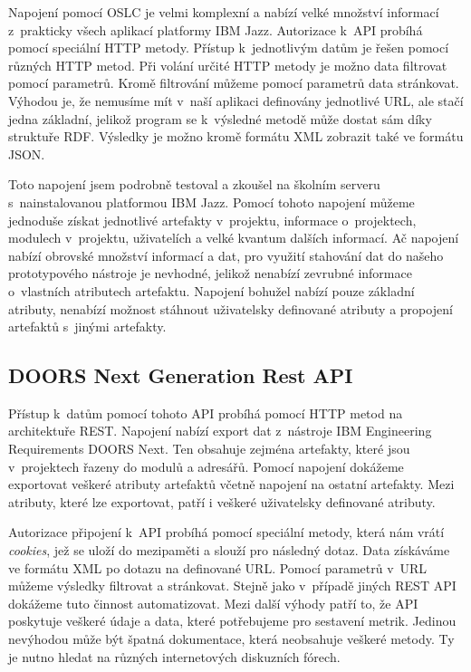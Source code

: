 \documentclass[czech,master]{diploma}
\begin{document}
Napojení pomocí OSLC je velmi komplexní a nabízí velké množství informací z~prakticky všech aplikací platformy IBM Jazz. Autorizace k~API probíhá pomocí speciální HTTP metody. Přístup k~jednotlivým datům je řešen pomocí různých HTTP metod. Při volání určité HTTP metody je možno data filtrovat pomocí parametrů. Kromě filtrování můžeme pomocí parametrů data stránkovat. Výhodou je, že nemusíme mít v~naší aplikaci definovány jednotlivé URL, ale stačí jedna základní, jelikož program se k~výsledné metodě může dostat sám díky struktuře RDF. Výsledky je možno kromě formátu XML zobrazit také ve formátu JSON.

Toto napojení jsem podrobně testoval a zkoušel na školním serveru s~nainstalovanou platformou IBM Jazz. Pomocí tohoto napojení můžeme jednoduše získat jednotlivé artefakty v~projektu, informace o~projektech, modulech v~projektu, uživatelích a velké kvantum dalších informací. Ač napojení nabízí obrovské množství informací a dat, pro využití stahování dat do našeho prototypového nástroje je nevhodné, jelikož nenabízí zevrubné informace o~vlastních atributech artefaktu. Napojení bohužel nabízí pouze základní atributy, nenabízí možnost stáhnout uživatelsky definované atributy a propojení artefaktů s~jinými artefakty.

\subsection{DOORS Next Generation Rest API}
Přístup k~datům pomocí tohoto API probíhá pomocí HTTP metod na architektuře REST. Napojení nabízí export dat z~nástroje IBM Engineering Requirements DOORS Next. Ten obsahuje zejména artefakty, které jsou v~projektech řazeny do modulů a adresářů. Pomocí napojení dokážeme exportovat veškeré atributy artefaktů včetně napojení na ostatní artefakty. Mezi atributy, které lze exportovat, patří i veškeré uživatelsky definované atributy.

Autorizace připojení k~API probíhá pomocí speciální metody, která nám vrátí \textit{cookies}, jež se uloží do mezipaměti a slouží pro následný dotaz. Data získáváme ve formátu XML po dotazu na definované URL. Pomocí parametrů v~URL můžeme výsledky filtrovat a stránkovat. Stejně jako v~případě jiných REST API dokážeme tuto činnost automatizovat. Mezi další výhody patří to, že API poskytuje veškeré údaje a data, které potřebujeme pro sestavení metrik. Jedinou nevýhodou může být špatná dokumentace, která neobsahuje veškeré metody. Ty je nutno hledat na různých internetových diskuzních fórech.
\end{document}
